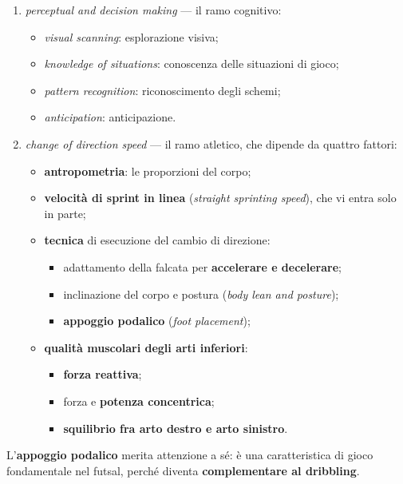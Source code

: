 \begin{enumerate}
  \item \textit{perceptual and decision making} --- il ramo cognitivo:
    \begin{itemize}
      \item \textit{visual scanning}: esplorazione visiva;
      \item \textit{knowledge of situations}: conoscenza delle situazioni di gioco;
      \item \textit{pattern recognition}: riconoscimento degli schemi;
      \item \textit{anticipation}: anticipazione.
    \end{itemize}
  \item \textit{change of direction speed} --- il ramo atletico, che dipende da quattro fattori:
    \begin{itemize}
      \item \textbf{antropometria}: le proporzioni del corpo;
      \item \textbf{velocità di sprint in linea} (\textit{straight sprinting speed}), che vi entra
        solo in parte;
      \item \textbf{tecnica} di esecuzione del cambio di direzione:
        \begin{itemize}
          \item adattamento della falcata per \textbf{accelerare e decelerare};
          \item inclinazione del corpo e postura (\textit{body lean and posture});
          \item \textbf{appoggio podalico} (\textit{foot placement});
        \end{itemize}
      \item \textbf{qualità muscolari degli arti inferiori}:
        \begin{itemize}
          \item \textbf{forza reattiva};
          \item forza e \textbf{potenza concentrica};
          \item \textbf{squilibrio fra arto destro e arto sinistro}.
        \end{itemize}
    \end{itemize}
\end{enumerate}

L'\textbf{appoggio podalico} merita attenzione a sé: è una caratteristica di gioco fondamentale nel
futsal, perché diventa \textbf{complementare al dribbling}.

